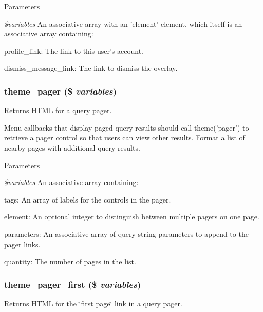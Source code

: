 \begin{DoxyParams}{Parameters}
\item[{\em \$variables}]An associative array with an 'element' element, which itself is an associative array containing:
\begin{DoxyItemize}
\item profile\_\-link: The link to this user's account.
\item dismiss\_\-message\_\-link: The link to dismiss the overlay. 
\end{DoxyItemize}\end{DoxyParams}
\hypertarget{group__themeable_ga3bfc8e62230af3fb60b061ee67c6d045}{
\subsubsection[{theme\_\-pager}]{\setlength{\rightskip}{0pt plus 5cm}theme\_\-pager (\$ {\em variables})}}
\label{group__themeable_ga3bfc8e62230af3fb60b061ee67c6d045}
Returns HTML for a query pager.

Menu callbacks that display paged query results should call theme('pager') to retrieve a pager control so that users can \hyperlink{classview}{view} other results. Format a list of nearby pages with additional query results.


\begin{DoxyParams}{Parameters}
\item[{\em \$variables}]An associative array containing:
\begin{DoxyItemize}
\item tags: An array of labels for the controls in the pager.
\item element: An optional integer to distinguish between multiple pagers on one page.
\item parameters: An associative array of query string parameters to append to the pager links.
\item quantity: The number of pages in the list. 
\end{DoxyItemize}\end{DoxyParams}
\hypertarget{group__themeable_gaffa784c4dec5d4263179d003782aeb4d}{
\subsubsection[{theme\_\-pager\_\-first}]{\setlength{\rightskip}{0pt plus 5cm}theme\_\-pager\_\-first (\$ {\em variables})}}
\label{group__themeable_gaffa784c4dec5d4263179d003782aeb4d}
Returns HTML for the \char`\"{}first page\char`\"{} link in a query pager.


